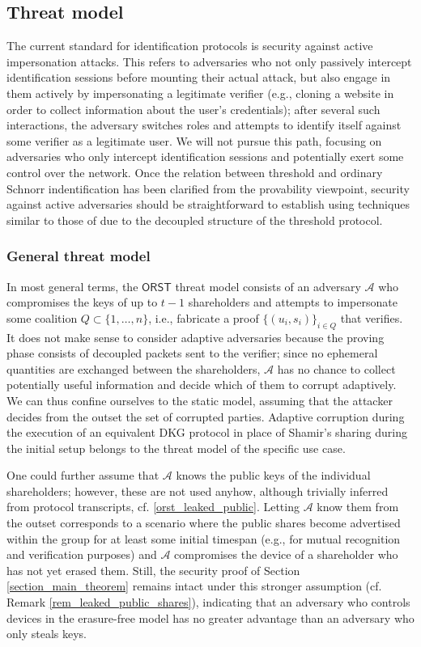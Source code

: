 \documentclass[10pt, psamsfonts, reqno]{amsart}
\theoremstyle{definition}
\theoremstyle{remark}
\numberwithin{equation}{section}
\begin{document}
\subsection{Threat model}\label{section_threat_model}

The current standard for identification protocols is
security against active impersonation attacks. This refers to
adversaries who not only passively intercept identification
sessions before mounting their actual attack,
but also engage in them actively by impersonating
a legitimate verifier (e.g., cloning a website in order
to collect information about the user's credentials);
after several such interactions, the adversary switches roles
and attempts to identify itself against some verifier as a
legitimate user.
We will not pursue this path, focusing
on adversaries who only intercept
identification sessions and potentially exert
some control over the network.
Once the relation between threshold and ordinary
Schnorr indentification has been clarified
from the provability viewpoint,
security against active adversaries should be straightforward
to establish using techniques similar to those
of \cite{paper_bellare_palacio}
due to the decoupled structure of the threshold protocol.

\subsubsection{General threat model}\label{section_general_threat_model}

In most general terms, the $\textsf{ORST}$ threat model
consists of an
adversary $\mathcal{A}$ who compromises the keys
of up to $t-1$ shareholders
and attempts to impersonate some coalition
$Q \subset \{1, \dots, n\}$,
i.e., fabricate a proof
$\{(u_i, s_i)\}_{i \in Q}$ that verifies.
It does not make sense to consider adaptive adversaries
because the proving phase consists of decoupled
packets sent to the verifier;
since no ephemeral quantities are exchanged between the shareholders,
$\mathcal{A}$ has no chance to collect potentially
useful information and decide which of them
to corrupt adaptively.
We can thus confine ourselves to the static model,
assuming that the attacker decides from the outset the
set of corrupted parties.
Adaptive corruption during the execution
of an equivalent DKG protocol in place of Shamir's sharing during
the initial setup belongs to the threat model
of the specific use case.

One could further
assume that $\mathcal{A}$ knows
the public keys of the individual shareholders;
however, these are not used anyhow,
although trivially inferred from protocol transcripts,
cf. \eqref{orst_leaked_public}.
Letting $\mathcal{A}$ know them from the outset
corresponds to a scenario where the public shares
become advertised within the group
for at least some initial timespan
(e.g., for mutual recognition and verification purposes)
and $\mathcal{A}$ compromises the device
of a shareholder who has not yet erased them.
Still, the security proof of
Section \ref{section_main_theorem}
remains intact under this stronger assumption
(cf. Remark \ref{rem_leaked_public_shares}), indicating that
an adversary who controls devices
in the erasure-free model has no greater advantage than an
adversary who only steals keys.
\end{document}
